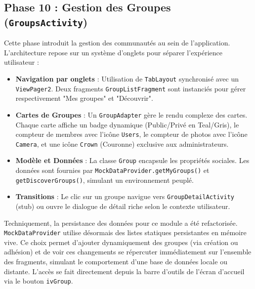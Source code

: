 \documentclass{article}
\begin{document}
\subsection{Phase 10 : Gestion des Groupes (\texttt{GroupsActivity})}
Cette phase introduit la gestion des communautés au sein de l'application. L'architecture repose sur un système d'onglets pour séparer l'expérience utilisateur :
\begin{itemize}
    \item \textbf{Navigation par onglets} : Utilisation de \texttt{TabLayout} synchronisé avec un \texttt{ViewPager2}. Deux fragments \texttt{GroupListFragment} sont instanciés pour gérer respectivement "Mes groupes" et "Découvrir".
    \item \textbf{Cartes de Groupes} : Un \texttt{GroupAdapter} gère le rendu complexe des cartes. Chaque carte affiche un badge dynamique (Public/Privé en Teal/Gris), le compteur de membres avec l'icône \texttt{Users}, le compteur de photos avec l'icône \texttt{Camera}, et une icône \texttt{Crown} (Couronne) exclusive aux administrateurs.
    \item \textbf{Modèle et Données} : La classe \texttt{Group} encapsule les propriétés sociales. Les données sont fournies par \texttt{MockDataProvider.getMyGroups()} et \texttt{getDiscoverGroups()}, simulant un environnement peuplé.
    \item \textbf{Transitions} : Le clic sur un groupe navigue vers \texttt{GroupDetailActivity} (stub) ou ouvre le dialogue de détail riche selon le contexte utilisateur.
\end{itemize}
Techniquement, la persistance des données pour ce module a été refactorisée. \texttt{MockDataProvider} utilise désormais des listes statiques persistantes en mémoire vive. Ce choix permet d'ajouter dynamiquement des groupes (via création ou adhésion) et de voir ces changements se répercuter immédiatement sur l'ensemble des fragments, simulant le comportement d'une base de données locale ou distante.
L'accès se fait directement depuis la barre d'outils de l'écran d'accueil via le bouton \texttt{ivGroup}.
\end{document}
